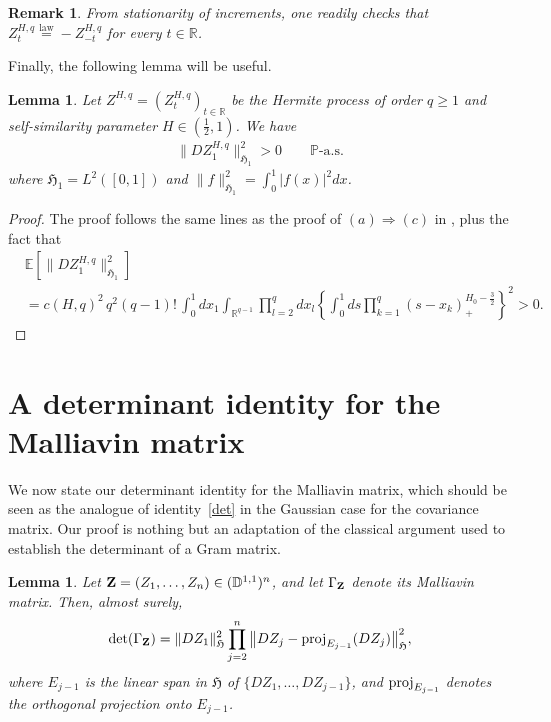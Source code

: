 \documentclass[a4paper,10pt]{article}
\theoremstyle{definition}
\theoremstyle{plain}
\newtheorem{Lemma}[Def]{Lemma}
\newtheorem{rem}[Def]{Remark}
\newcommand{\R}{\mathbb{R}}
\newcommand{\E}{\mathbb{E}}
\newcommand\HHH{\mathfrak{H}}
\newcommand\1{\mathbbm{1}}
\begin{document}
\begin{rem}
From stationarity of increments, one readily checks that $Z_t^{H,q}\overset{\text{law}}{=}-Z_{-t}^{H,q}$ for every $t\in\R$.
\end{rem}

Finally, the following lemma will be useful.
\begin{Lemma}\label{lem:positive}
  Let  $Z^{H,q}=\left(Z^{H,q}_t\right)_{t\in \R}$ be the Hermite process of order $q \geqslant 1$ and self-similarity parameter $H \in\left(\frac{1}{2}, 1\right)$. We have
  \begin{align}
    \|DZ^{H,q}_1\|_{\HHH_1}^2 >0 \qquad \mathbb{P}\text{-a.s.}
  \end{align}
  where $\HHH_1= L^2([0,1])$ and $\|f\|_{\HHH_{1}}^2=\int_0^1|f(x)|^2 dx$. 
\end{Lemma}
\begin{proof}
  The proof follows the same lines as the proof of $(a)\Rightarrow(c)$ in  \cite[Theorem 3.1]{NNP}, plus the fact that 
  \begin{align*}
    &\E\left[\|DZ^{H,q}_1\|_{\HHH_1}^2\right] \\
    &= c(H, q)^2\,q^2(q-1)!\,\int_0^1dx_1\int_{\R^{q-1}}\prod_{l=2}^{q}dx_l\left\{\int_0^{1}ds\prod_{k=1}^{q}\left(s-x_{k}\right)_{+}^{H_0-\frac{3}{2}}\right\}^2>0.
  \end{align*}
\end{proof}




\section{A determinant identity for the Malliavin matrix}\label{sec:det}

We now state our determinant identity for the Malliavin matrix, which should be seen as the analogue of identity~\eqref{det} in the Gaussian case for the covariance matrix.  
Our proof is nothing but an adaptation of the classical argument used to establish the determinant of a Gram matrix.

\begin{Lemma}\label{Lemma:detGamma}
Let ${\bf Z}=(Z_1,\ldots,Z_n) \in (\mathbb{D}^{1,1})^n$, and let $\Gamma_{\bf Z}$ denote its Malliavin matrix. Then, almost surely,
\begin{align}\label{eq:detGamma88}
\det(\Gamma_{\bf Z})
= \|DZ_1\|_{\HHH}^2
  \prod_{j=2}^n \big\|DZ_j - {\rm proj}_{E_{j-1}}(DZ_j)\big\|_{\HHH}^2,
\end{align}
where $E_{j-1}$ is the linear span in $\HHH$ of $\{DZ_1,\ldots,DZ_{j-1}\}$, and ${\rm proj}_{E_{j-1}}$ denotes the orthogonal projection onto $E_{j-1}$.
\end{Lemma}
\end{document}
